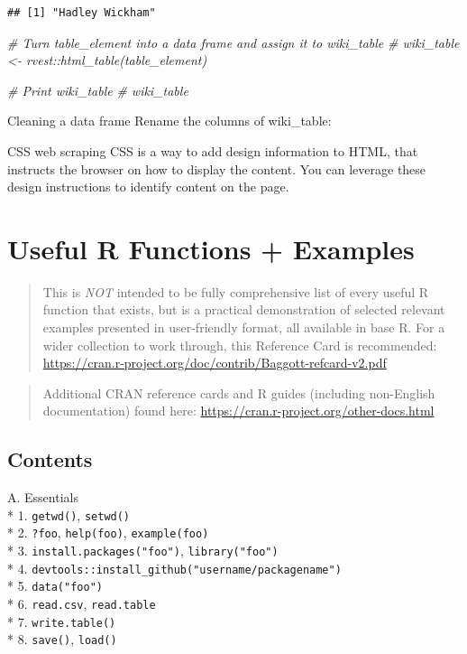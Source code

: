 \documentclass[]{book}
\newenvironment{Shaded}{\begin{snugshade}}{\end{snugshade}}
\newcommand{\CommentTok}[1]{\textcolor[rgb]{0.56,0.35,0.01}{\textit{#1}}}
\begin{document}
\begin{verbatim}
## [1] "Hadley Wickham"
\end{verbatim}

\begin{Shaded}
\begin{Highlighting}[]
\CommentTok{# Turn table_element into a data frame and assign it to wiki_table}
\CommentTok{# wiki_table <- rvest::html_table(table_element)}

\CommentTok{# Print wiki_table}
\CommentTok{# wiki_table}
\end{Highlighting}
\end{Shaded}

Cleaning a data frame
Rename the columns of wiki\_table:

CSS web scraping
CSS is a way to add design information to HTML, that instructs the browser on how to display the content. You can leverage these design instructions to identify content on the page.

\hypertarget{useful-r-functions-examples}{%
\chapter{Useful R Functions + Examples}\label{useful-r-functions-examples}}

\begin{quote}
This is \emph{NOT} intended to be fully comprehensive list of every useful R function that exists, but is a practical demonstration of selected relevant examples presented in user-friendly format, all available in base R. For a wider collection to work through, this Reference Card is recommended: \url{https://cran.r-project.org/doc/contrib/Baggott-refcard-v2.pdf}
\end{quote}

\begin{quote}
Additional CRAN reference cards and R guides (including non-English documentation) found here: \url{https://cran.r-project.org/other-docs.html}
\end{quote}

\hypertarget{contents}{%
\section{Contents}\label{contents}}

A. Essentials\\
* 1. \texttt{getwd()}, \texttt{setwd()}\\
* 2. \texttt{?foo}, \texttt{help(foo)}, \texttt{example(foo)}\\
* 3. \texttt{install.packages("foo")}, \texttt{library("foo")}\\
* 4. \texttt{devtools::install\_github("username/packagename")}\\
* 5. \texttt{data("foo")}\\
* 6. \texttt{read.csv}, \texttt{read.table}\\
* 7. \texttt{write.table()}\\
* 8. \texttt{save()}, \texttt{load()}
\end{document}
